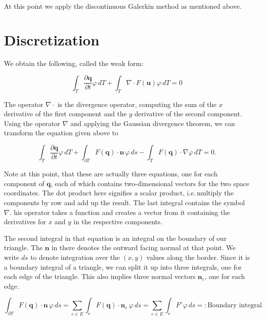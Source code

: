 \documentclass{article}
\newcommand{\pd}[2]{\dfrac{\partial #1}{\partial #2}}
\renewcommand{\phi}{\varphi}
\begin{document}
At this point we apply the discontinuous Galerkin method as mentioned above.

\section{Discretization}
\label{sec:discretization}

We obtain the following, called the weak form:

\begin{equation}
  \label{eq:shallow-water-weak-form}
  \int_T \pd{\mathbf{q}}{t} \phi \,dT + \int_T \nabla \cdot F(\mathbf{u}) \phi \,dT = 0
\end{equation}

The operator $\nabla \cdot$ is the divergence operator, computing the sum of the $x$ derivative of the first component and the $y$ derivative of the second component. Using the operator $\nabla$ and applying the Gaussian divergence theorem, we can transform the equation given above to

\begin{equation}
  \label{eq:shallow-water-weak-form-div-applied}
  \int_T \pd {\mathbf{q}}{t} \phi \, dT +
  \int_{\partial T} F(\mathbf{q}) \cdot \mathbf{n} \, \phi \, ds -
  \int_T F(\mathbf{q}) \cdot \nabla \phi \, dT = 0.
\end{equation}

Note at this point, that these are actually three equations, one for each component of $\mathbf{q}$, each of which contains two-dimensional vectors for the two space coordinates.
The dot product here signifies a scalar product, i.e.\,multiply the components by row and add up the result.
The last integral contains the symbol $\nabla$.
his operator takes a function and creates a vector from it containing the derivatives for $x$ and $y$ in the respective components.

The second integral in that equation is an integral on the boundary of our triangle.
The $\mathbf{n}$ in there denotes the outward facing normal at that point.
We write $ds$ to denote integration over the $(x,y)$ values along the border.
Since it is a boundary integral of a triangle, we can split it up into three integrals, one for each edge of the triangle.
This also implies three normal vectors $\mathbf{n}_e$, one for each edge.

\begin{equation}
  \label{eq:boundary-integral-sum}
  \int_{\partial T} F(\mathbf{q}) \cdot \mathbf{n} \, \phi \, ds = \sum_{e \in E} \int_{e} F(\mathbf{q}) \cdot \mathbf{n}_e \, \phi \, ds = \sum_{e \in E} \int_{e} F^e \phi \, ds =: \text{Boundary integral}
\end{equation}
\end{document}
